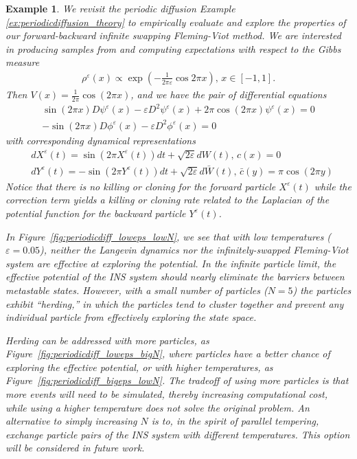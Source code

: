 \documentclass[english,11pt]{article}%
\newtheorem{example}{Example}
\numberwithin{equation}{section}
\numberwithin{example}{section}
\numberwithin{theorem}{section}
\begin{document}
\begin{example} \label{ex:periodicdiffusion_computation}
We revisit the periodic diffusion Example \ref{ex:periodicdiffusion_theory} to empirically evaluate and explore the properties of our forward-backward infinite swapping Fleming-Viot method. We are interested in producing samples from and computing expectations with respect to the Gibbs measure 
\begin{align}
    \rho^\varepsilon(x) \propto \exp\left(- \frac{1}{2\pi\varepsilon} \cos 2\pi x \right), \, x \in [-1,1].
\end{align}
Then $V(x) = \frac{1}{2\pi}\cos(2\pi x)$, and we have the pair of differential equations 
\begin{align}
 \sin(2\pi x) D\psi^\varepsilon(x) - \varepsilon D^2 \psi^\varepsilon(x) + 2\pi \cos(2\pi x) \psi^\varepsilon(x)= 0 \\
-\sin(2 \pi x) D\phi^\varepsilon(x) - {\varepsilon} D^2 \phi^\varepsilon(x) = 0
\end{align}
with corresponding dynamical representations 
\begin{align}
    &dX^\varepsilon(t) = \sin(2\pi X^\varepsilon(t)) dt + \sqrt{2\varepsilon} dW(t), \, c(x) = 0 \\
    &dY^\varepsilon(t) = - \sin(2\pi Y^\varepsilon(t)) dt + \sqrt{2\varepsilon} d\bar{W}(t), \, \bar{c}(y) = \pi  \cos (2\pi y)
\end{align}
Notice that there is no killing or cloning for the forward particle $X^\varepsilon(t)$ while the correction term yields a killing or cloning rate related to the Laplacian of the potential function for the backward particle $Y^\varepsilon(t)$. 

In Figure~\ref{fig:periodicdiff_loweps_lowN}, we see that with low temperatures ($\varepsilon = 0.05$), neither the Langevin dynamics nor the infinitely-swapped Fleming-Viot system are effective at exploring the potential. In the infinite particle limit, the effective potential of the INS system should nearly eliminate the barriers between metastable states. However, with a small number of particles ($N = 5$) the particles exhibit ``herding,'' in which the particles tend to cluster together and prevent any individual particle from effectively exploring the state space. 


Herding can be addressed with more particles, as Figure~\ref{fig:periodicdiff_loweps_bigN}, where particles have a better chance of exploring the effective potential, or with higher temperatures, as Figure~\ref{fig:periodicdiff_bigeps_lowN}. The tradeoff of using more particles is that more events will need to be simulated, thereby increasing computational cost, while using a higher temperature does not solve the original problem. 
An alternative to simply increasing $N$ is to, in the spirit of parallel tempering, exchange particle pairs of the INS system with different temperatures.
This option will be considered in future work.




\end{example}
\end{document}

